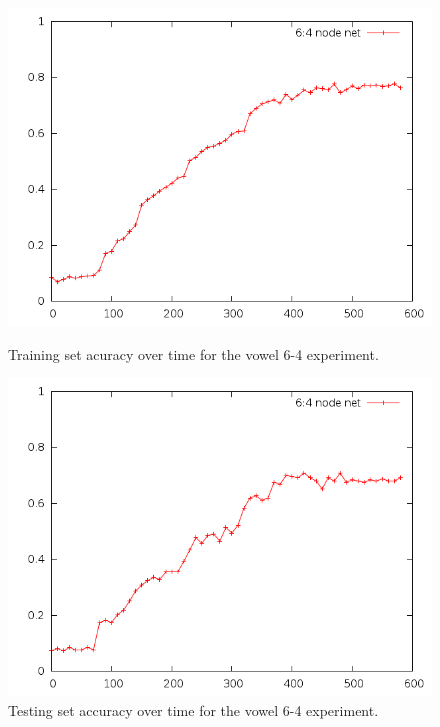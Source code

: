\documentclass[12pt]{article}
\begin{document}
\begin{figure}[!ht]
    \centering
    \begin{minipage}[b]{0.45\linewidth}
        \includegraphics[width=1.0\textwidth]{vowel-special-training}
        \caption{Training set acuracy over time for the vowel 6-4 experiment.}
        \label{fig:vowel_special_training}
    \end{minipage}
    \quad
    \begin{minipage}[b]{0.45\linewidth}
        \includegraphics[width=1.0\textwidth]{vowel-special-testing}
        \caption{Testing set accuracy over time for the vowel 6-4 experiment.}
        \label{fig:vowel_special_testing}
    \end{minipage}
\end{figure}
\end{document}
